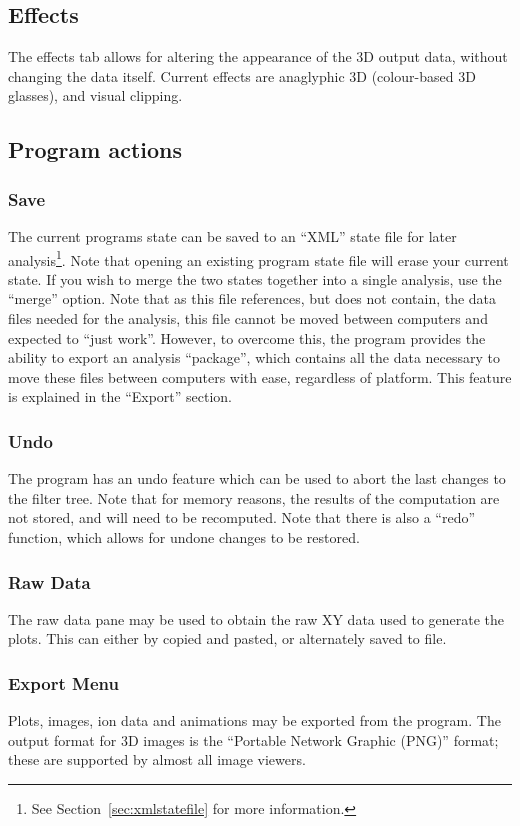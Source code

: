 \documentclass[10pt]{article}
\begin{document}
\subsection{Effects}
The effects tab allows for altering the appearance of the 3D output data, without changing the data itself. Current effects are anaglyphic 3D (colour-based 3D glasses), and visual clipping.  

\subsection{Program actions}

\subsubsection{Save}
The current programs state can be saved to an ``XML'' state file for later analysis\footnote{See Section~\ref{sec:xmlstatefile} for more information.}. Note that opening an existing program state file will erase your current state. If you wish to merge the two states together into a single analysis, use the ``merge'' option. Note that as this file references, but does not contain, the data files needed for the analysis, this file cannot be moved between computers and expected to ``just work''. However, to overcome this, the program provides the ability to export an analysis ``package'', which contains all the data necessary to move these files between computers with ease, regardless of platform. This feature is explained in the ``Export'' section.

\subsubsection{Undo}
The program has an undo feature which can be used to abort the last changes to the filter tree. Note that for memory reasons, the results of the computation are not stored, and will need to be recomputed. Note that there is also a ``redo'' function, which allows for undone changes to be restored. 

\subsubsection{Raw Data}
The raw data pane may be used to obtain the raw XY data used to generate the plots. This can either by copied and pasted, or alternately saved to file.  

\subsubsection{Export Menu}
Plots, images, ion data and animations may be exported from the program. The output format for 3D images is the ``Portable Network Graphic (PNG)'' format; these are supported by almost all image viewers. 
\end{document}

